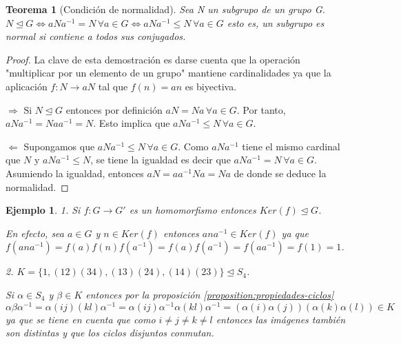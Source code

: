 \documentclass{article}
\theoremstyle{theorem-style}  %
\newtheorem{theorem}{Teorema}[section]  %
\theoremstyle{definition-style}
\theoremstyle{example-style}
\newtheorem{example}{Ejemplo}[section]
\begin{document}
\begin{theorem}[Condición de normalidad]\label{theorem:criterio-normalidad}
Sea N un subgrupo de un grupo G. $N \unlhd G \iff aNa^{-1} = N  \, \forall a \in G \iff aNa^{-1} \le N \, \forall a \in G$ esto es, un subgrupo es normal si contiene a todos sus conjugados.
\end{theorem}
\begin{proof}
La clave de esta demostración es darse cuenta que la operación "multiplicar por un elemento de un grupo" mantiene cardinalidades ya que la aplicación $f:N \rightarrow aN$ tal que $f(n) = an$ es biyectiva.

$\Rightarrow$ Si $N \unlhd G$ entonces por definición $aN = Na \, \forall a \in G$. Por tanto, $aNa^{-1} = Naa^{-1} = N$. Esto implica que $aNa^{-1} \le N \, \forall a \in G$.

$\Leftarrow$ Supongamos que $aNa^{-1} \le N \, \forall a \in G$. Como $aNa^{-1}$ tiene el mismo cardinal que $N$ y $aNa^{-1} \le N$, se tiene la igualdad es decir que $aNa^{-1} = N \, \forall a \in G$. Asumiendo la igualdad, entonces $aN = aa^{-1}Na = Na$ de donde se deduce la normalidad.
\end{proof}

\begin{example}
1. Si $f:G \rightarrow G'$ es un homomorfismo entonces $Ker(f) \trianglelefteq G$.

En efecto, sea $a \in G$ y $n \in Ker(f)$ entonces $ana^{-1} \in Ker(f)$ ya que $f(ana^{-1}) = f(a)f(n)f(a^{-1}) = f(a)f(a^{-1}) = f(aa^{-1}) = f(1) = 1$.

2. $K = \{1,(12)(34),(13)(24),(14)(23)\} \trianglelefteq S_4$.

Si $\alpha \in S_4$ y $\beta \in K$ entonces por la proposición \ref{proposition:propiedades-ciclos} $\alpha \beta  \alpha^{-1} = \alpha (ij)(kl) \alpha^{-1} =\alpha (ij) \alpha^{-1} \alpha (kl) \alpha^{-1} = (\alpha(i) \alpha(j))(\alpha(k) \alpha(l)) \in K$ ya que se tiene en cuenta que como  $i \neq j \neq k \neq l$ entonces las imágenes también son distintas y que los ciclos disjuntos conmutan.
\end{example}
\end{document}
